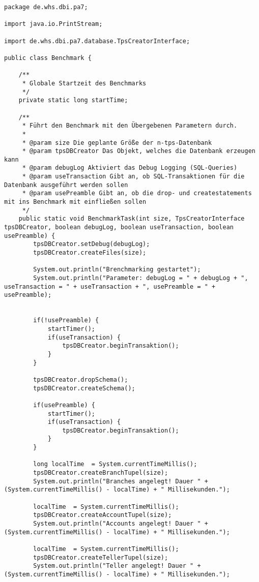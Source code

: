 \begin{lstlisting}[caption={Benchmark (optimiert)}, label={lst:bmv2}]
package de.whs.dbi.pa7;

import java.io.PrintStream;

import de.whs.dbi.pa7.database.TpsCreatorInterface;

public class Benchmark {
	
	/**
	 * Globale Startzeit des Benchmarks
	 */
	private static long startTime;
	
	/**
	 * Führt den Benchmark mit den Übergebenen Parametern durch.
	 * 
	 * @param size Die geplante Größe der n-tps-Datenbank
	 * @param tpsDBCreator Das Objekt, welches die Datenbank erzeugen kann
	 * @param debugLog Aktiviert das Debug Logging (SQL-Queries)
	 * @param useTransaction Gibt an, ob SQL-Transaktionen für die Datenbank ausgeführt werden sollen
	 * @param usePreamble Gibt an, ob die drop- und createstatements mit ins Benchmark mit einfließen sollen
	 */
	public static void BenchmarkTask(int size, TpsCreatorInterface tpsDBCreator, boolean debugLog, boolean useTransaction, boolean usePreamble) {
		tpsDBCreator.setDebug(debugLog);
		tpsDBCreator.createFiles(size);
		
		System.out.println("Brenchmarking gestartet");
		System.out.println("Parameter: debugLog = " + debugLog + ", useTransaction = " + useTransaction + ", usePreamble = " + usePreamble);

		
		if(!usePreamble) {
			startTimer();
			if(useTransaction) {
				tpsDBCreator.beginTransaktion();
			}
		}

		tpsDBCreator.dropSchema();
		tpsDBCreator.createSchema();
		
		if(usePreamble) {
			startTimer();
			if(useTransaction) {
				tpsDBCreator.beginTransaktion();
			}
		}
		
		long localTime  = System.currentTimeMillis();
		tpsDBCreator.createBranchTupel(size);
		System.out.println("Branches angelegt! Dauer " + (System.currentTimeMillis() - localTime) + " Millisekunden.");
		
		localTime  = System.currentTimeMillis();
		tpsDBCreator.createAccountTupel(size);
		System.out.println("Accounts angelegt! Dauer " + (System.currentTimeMillis() - localTime) + " Millisekunden.");
		
		localTime  = System.currentTimeMillis();
		tpsDBCreator.createTellerTupel(size);
		System.out.println("Teller angelegt! Dauer " + (System.currentTimeMillis() - localTime) + " Millisekunden.");
		

\end{lstlisting}
